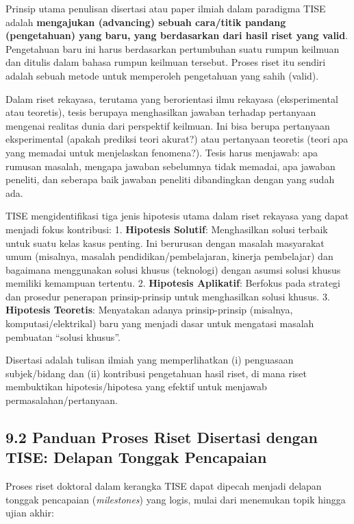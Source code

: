 \documentclass[
  letterpaper,
  DIV=11,
  numbers=noendperiod]{scrreprt}
\begin{document}
Prinsip utama penulisan disertasi atau paper ilmiah dalam paradigma TISE
adalah \textbf{mengajukan (advancing) sebuah cara/titik pandang
(pengetahuan) yang baru, yang berdasarkan dari hasil riset yang valid}.
Pengetahuan baru ini harus berdasarkan pertumbuhan suatu rumpun keilmuan
dan ditulis dalam bahasa rumpun keilmuan tersebut. Proses riset itu
sendiri adalah sebuah metode untuk memperoleh pengetahuan yang sahih
(valid).

Dalam riset rekayasa, terutama yang berorientasi ilmu rekayasa
(eksperimental atau teoretis), tesis berupaya menghasilkan jawaban
terhadap pertanyaan mengenai realitas dunia dari perspektif keilmuan.
Ini bisa berupa pertanyaan eksperimental (apakah prediksi teori akurat?)
atau pertanyaan teoretis (teori apa yang memadai untuk menjelaskan
fenomena?). Tesis harus menjawab: apa rumusan masalah, mengapa jawaban
sebelumnya tidak memadai, apa jawaban peneliti, dan seberapa baik
jawaban peneliti dibandingkan dengan yang sudah ada.

TISE mengidentifikasi tiga jenis hipotesis utama dalam riset rekayasa
yang dapat menjadi fokus kontribusi: 1. \textbf{Hipotesis Solutif}:
Menghasilkan solusi terbaik untuk suatu kelas kasus penting. Ini
berurusan dengan masalah masyarakat umum (misalnya, masalah
pendidikan/pembelajaran, kinerja pembelajar) dan bagaimana menggunakan
solusi khusus (teknologi) dengan asumsi solusi khusus memiliki kemampuan
tertentu. 2. \textbf{Hipotesis Aplikatif}: Berfokus pada strategi dan
prosedur penerapan prinsip-prinsip untuk menghasilkan solusi khusus. 3.
\textbf{Hipotesis Teoretis}: Menyatakan adanya prinsip-prinsip
(misalnya, komputasi/elektrikal) baru yang menjadi dasar untuk mengatasi
masalah pembuatan ``solusi khusus''.

Disertasi adalah tulisan ilmiah yang memperlihatkan (i) penguasaan
subjek/bidang dan (ii) kontribusi pengetahuan hasil riset, di mana riset
membuktikan hipotesis/hipotesa yang efektif untuk menjawab
permasalahan/pertanyaan.

\subsection{\texorpdfstring{\textbf{9.2 Panduan Proses Riset Disertasi
dengan TISE: Delapan Tonggak
Pencapaian}}{9.2 Panduan Proses Riset Disertasi dengan TISE: Delapan Tonggak Pencapaian}}\label{panduan-proses-riset-disertasi-dengan-tise-delapan-tonggak-pencapaian}

Proses riset doktoral dalam kerangka TISE dapat dipecah menjadi delapan
tonggak pencapaian (\emph{milestones}) yang logis, mulai dari menemukan
topik hingga ujian akhir:
\end{document}
